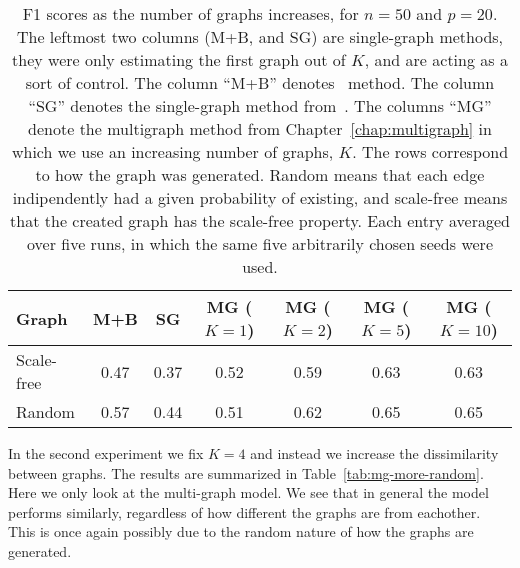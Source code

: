 \documentclass[a4paper, 11pt, oneside]{report}
\newcommand{\1}{\mathds{1}}
\begin{document}
\begin{table}[ht]
  \caption{F1 scores as the number of graphs increases, for $n=50$ and $p=20$.
  The leftmost two columns (M+B, and SG) are single-graph methods,
they were only estimating the first graph out of $K$, and are acting as a sort of control.
The column ``M+B'' denotes~\cite{mein2006} method.
The column ``SG'' denotes the single-graph method from~\cite{limcco-2017}.
The columns ``MG'' denote the multigraph method from Chapter~\ref{chap:multigraph} in which we use an increasing number of graphs, $K$.
The rows correspond to how the graph was generated. 
Random means that each edge indipendently had a given probability of existing, 
and scale-free means that the created graph has the scale-free property.
Each entry averaged over five runs, in which the same five arbitrarily chosen seeds were used.}
  \label{tab:mg-more-graphs}
  \begin{center}
    \begin{tabular}[c]{l|cccccc}
      \toprule
      Graph & M+B & SG & MG ($K = 1$) & MG ($K = 2$) & MG ($K = 5$) & MG ($K = 10$) \\
      \midrule
      Scale-free & 0.47 & 0.37 & 0.52 & 0.59 & 0.63 & 0.63 \\
      \midrule
      Random & 0.57 & 0.44 & 0.51 & 0.62 & 0.65 & 0.65 \\
      \bottomrule
    \end{tabular}
  \end{center}
\end{table}

In the second experiment we fix $K=4$ and instead we increase the dissimilarity between graphs.
The results are summarized in Table~\ref{tab:mg-more-random}. 
Here we only look at the multi-graph model.
We see that in general the model performs similarly,
regardless of how different the graphs are from eachother.
This is once again possibly due to the random nature of how the graphs are generated.
\end{document}
